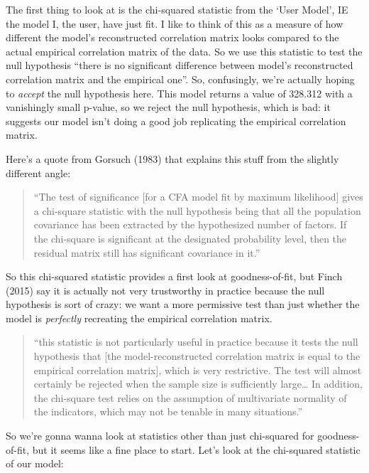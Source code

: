\documentclass[
  letterpaper,
  DIV=11,
  numbers=noendperiod]{scrreprt}
\begin{document}
The first thing to look at is the chi-squared statistic from the `User
Model', IE the model I, the user, have just fit. I like to think of this
as a measure of how different the model's reconstructed correlation
matrix looks compared to the actual empirical correlation matrix of the
data. So we use this statistic to test the null hypothesis ``there is no
significant difference between model's reconstructed correlation matrix
and the empirical one''. So, confusingly, we're actually hoping to
\emph{accept} the null hypothesis here. This model returns a value of
328.312 with a vanishingly small p-value, so we reject the null
hypothesis, which is bad: it suggests our model isn't doing a good job
replicating the empirical correlation matrix.

Here's a quote from Gorsuch (1983) that explains this stuff from the
slightly different angle:

\begin{quote}
``The test of significance {[}for a CFA model fit by maximum
likelihood{]} gives a chi-square statistic with the null hypothesis
being that all the population covariance has been extracted by the
hypothesized number of factors. If the chi-square is significant at the
designated probability level, then the residual matrix still has
significant covariance in it.''
\end{quote}

So this chi-squared statistic provides a first look at goodness-of-fit,
but Finch (2015) say it is actually not very trustworthy in practice
because the null hypothesis is sort of crazy: we want a more permissive
test than just whether the model is \emph{perfectly} recreating the
empirical correlation matrix.

\begin{quote}
``this statistic is not particularly useful in practice because it tests
the null hypothesis that {[}the model-reconstructed correlation matrix
is equal to the empirical correlation matrix{]}, which is very
restrictive. The test will almost certainly be rejected when the sample
size is sufficiently large\ldots{} In addition, the chi-square test
relies on the assumption of multivariate normality of the indicators,
which may not be tenable in many situations.''
\end{quote}

So we're gonna wanna look at statistics other than just chi-squared for
goodness-of-fit, but it seems like a fine place to start. Let's look at
the chi-squared statistic of our model:
\end{document}
